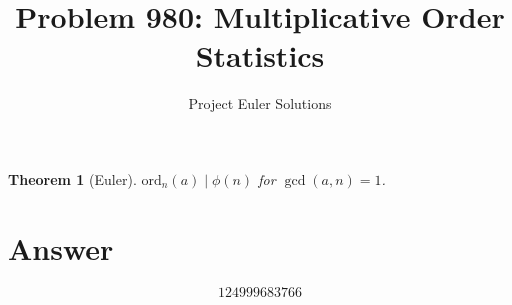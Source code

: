 \documentclass[11pt]{article}
\title{Problem 980: Multiplicative Order Statistics}
\author{Project Euler Solutions}
\date{}
\newtheorem{theorem}{Theorem}
\begin{document}
\maketitle
\begin{theorem}[Euler]
$\mathrm{ord}_n(a) \mid \phi(n)$ for $\gcd(a,n)=1$.
\end{theorem}
\section{Answer}

\[
\boxed{124999683766}
\]
\end{document}

